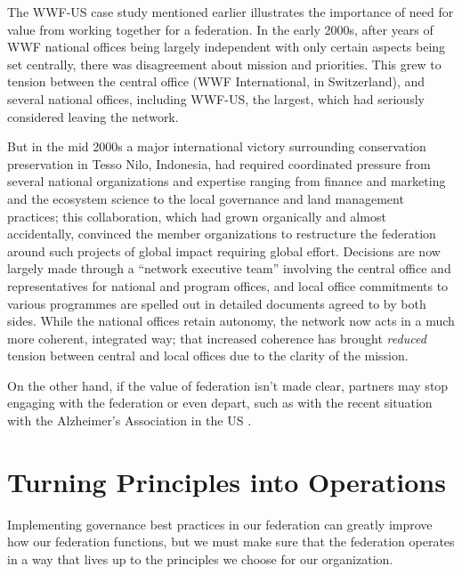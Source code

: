 \documentclass[11pt, letterpaper, twoside]{article}
\begin{document}
The WWF-US case study mentioned earlier illustrates the importance of
need for value from working together for a federation. In the early
2000s, after years of WWF national offices being largely independent
with only certain aspects being set centrally, there was disagreement
about mission and priorities. This grew to tension between the central
office (WWF International, in Switzerland), and several national
offices, including WWF-US, the largest, which had seriously considered
leaving the network.

But in the mid 2000s a major international victory surrounding
conservation preservation in Tesso Nilo, Indonesia, had required
coordinated pressure from several national organizations and expertise
ranging from finance and marketing and the ecosystem science to the
local governance and land management practices; this collaboration,
which had grown organically and almost accidentally, convinced the
member organizations to restructure the federation around such projects
of global impact requiring global effort. Decisions are now largely made
through a ``network executive team'' involving the central office and
representatives for national and program offices, and local office
commitments to various programmes are spelled out in detailed documents
agreed to by both sides. While the national offices retain autonomy, the
network now acts in a much more coherent, integrated way; that increased
coherence has brought \emph{reduced} tension between central and local
offices due to the clarity of the mission.

On the other hand, if the value of federation isn't made clear, partners
may stop engaging with the federation or even depart, such as with the
recent situation with the Alzheimer's Association in the US \citep{alzheimers}.

\section*{Turning Principles into Operations}
%
%

Implementing governance best practices in our federation can greatly
improve how our federation functions, but we must make sure that the
federation operates in a way that lives up to the principles we choose
for our organization.

\end{document}
